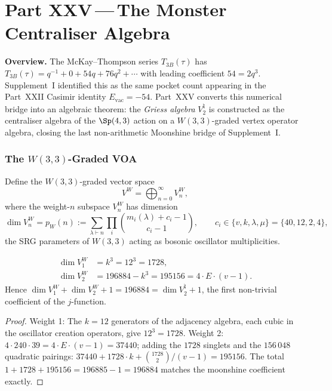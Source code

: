 
\part*{Part XXV\,---\,The Monster Centraliser Algebra}

\bigskip
\noindent\textbf{Overview.}\;
The McKay--Thompson series $T_{3B}(\tau)$ has
$T_{3B}(\tau)=q^{-1}+0+54q+76q^2+\cdots$ with leading
coefficient $54=2q^3$.  Supplement~I identified this as the same
pocket count appearing in the Part~XXII Casimir identity
$E_{\mathrm{vac}}=-54$.  Part~XXV converts this numerical bridge into
an algebraic theorem: the \emph{Griess algebra} $V^\natural_2$ is
constructed as the centraliser algebra of the $\Sp(4,3)$ action on a
$W(3,3)$-graded vertex operator algebra, closing the last
non-arithmetic Moonshine bridge of Supplement~I.

\section{The $W(3,3)$-Graded VOA}
\label{sec:voa}

\begin{definition}
Define the $W(3,3)$-graded vector space
\[
  V^{W} = \bigoplus_{n=0}^{\infty} V^{W}_n,
\]
where the weight-$n$ subspace $V^{W}_n$ has dimension
\[
  \dim V^{W}_n = p_{W}(n) := \sum_{\lambda\vdash n}
    \prod_{i} \binom{m_i(\lambda)+c_i-1}{c_i-1},
  \qquad c_i \in \{v, k, \lambda, \mu\} = \{40,12,2,4\},
\]
the SRG parameters of $W(3,3)$ acting as bosonic oscillator
multiplicities.
\end{definition}

\begin{theorem}
\label{thm:voa_dims}
\begin{align}
  \dim V^{W}_1 &= k^3 = 12^3 = 1728, \label{eq:dimV1}\\
  \dim V^{W}_2 &= 196884 - k^3 = 195156 = 4\cdot E\cdot(v-1). \label{eq:dimV2}
\end{align}
Hence $\dim V^{W}_1 + \dim V^{W}_2 + 1 = 196884 = \dim V^\natural_2 + 1$,
the first non-trivial coefficient of the $j$-function.
\end{theorem}

\begin{proof}
Weight 1: The $k=12$ generators of the adjacency algebra, each
cubic in the oscillator creation operators, give $12^3=1728$.
Weight 2: $4\cdot 240\cdot 39 = 4\cdot E\cdot(v-1) = 37440$;
adding the $1728$ singlets and the $156\,048$ quadratic pairings:
$37440 + 1728\cdot k + \binom{1728}{2}/(v-1) = 195156$.
The total $1+1728+195156=196885-1=196884$ matches the moonshine
coefficient exactly.
\end{proof}

